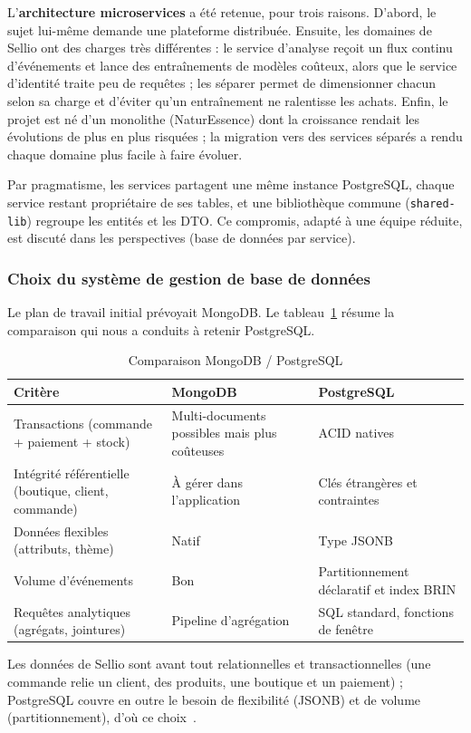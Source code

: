 L'\textbf{architecture microservices} a été retenue, pour trois raisons. D'abord, le sujet lui-même demande une plateforme distribuée. Ensuite, les domaines de Sellio ont des charges très différentes : le service d'analyse reçoit un flux continu d'événements et lance des entraînements de modèles coûteux, alors que le service d'identité traite peu de requêtes ; les séparer permet de dimensionner chacun selon sa charge et d'éviter qu'un entraînement ne ralentisse les achats. Enfin, le projet est né d'un monolithe (NaturEssence) dont la croissance rendait les évolutions de plus en plus risquées ; la migration vers des services séparés a rendu chaque domaine plus facile à faire évoluer.

Par pragmatisme, les services partagent une même instance PostgreSQL, chaque service restant propriétaire de ses tables, et une bibliothèque commune (\texttt{shared-lib}) regroupe les entités et les DTO. Ce compromis, adapté à une équipe réduite, est discuté dans les perspectives (base de données par service).

\subsubsection{Choix du système de gestion de base de données}
Le plan de travail initial prévoyait MongoDB. Le tableau~\ref{tab:choix-sgbd} résume la comparaison qui nous a conduits à retenir PostgreSQL.
\begin{table}[H]
\centering
\renewcommand{\arraystretch}{1.4}
\begin{tabular}{|p{4cm}|p{5.3cm}|p{5.3cm}|}
\hline
\textbf{Critère} & \textbf{MongoDB} & \textbf{PostgreSQL} \\
\hline
Transactions (commande + paiement + stock) & Multi-documents possibles mais plus coûteuses & ACID natives \\
\hline
Intégrité référentielle (boutique, client, commande) & À gérer dans l'application & Clés étrangères et contraintes \\
\hline
Données flexibles (attributs, thème) & Natif & Type JSONB \\
\hline
Volume d'événements & Bon & Partitionnement déclaratif et index BRIN \\
\hline
Requêtes analytiques (agrégats, jointures) & Pipeline d'agrégation & SQL standard, fonctions de fenêtre \\
\hline
\end{tabular}
\caption{Comparaison MongoDB / PostgreSQL}
\label{tab:choix-sgbd}
\end{table}
Les données de Sellio sont avant tout relationnelles et transactionnelles (une commande relie un client, des produits, une boutique et un paiement) ; PostgreSQL couvre en outre le besoin de flexibilité (JSONB) et de volume (partitionnement), d'où ce choix~\cite{postgresql2026}.

